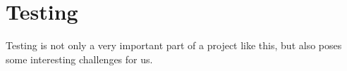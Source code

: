 
\chapter{Testing}

Testing is not only a very important part of a project like this, but also poses some interesting challenges for us. 